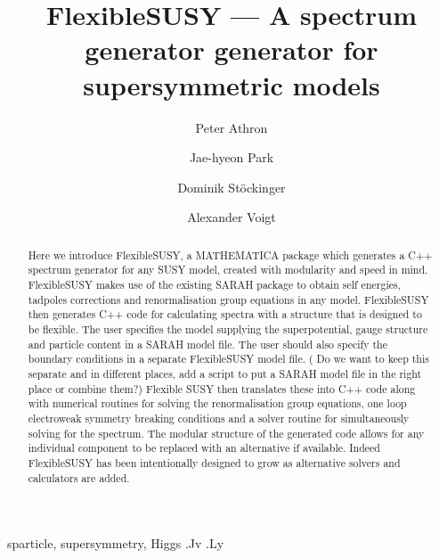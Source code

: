 \documentclass[final,3p,times,pdflatex]{elsarticle}
\newcommand{\sarah}{SARAH\xspace}
\newcommand{\fs}{FlexibleSUSY\xspace}
\begin{document}
\begin{frontmatter}

 \title{\Large\bf FlexibleSUSY --- A spectrum generator generator for supersymmetric models}

\author{Peter Athron}
\address{ARC Centre of Excellence for Particle Physics at 
the Tera-scale, School of Chemistry and Physics, University of Adelaide, 
Adelaide SA 5005 Australia}
\author{Jae-hyeon Park}
\author{Dominik St\"ockinger}
\author{Alexander Voigt}
\address{Institut f\"ur Kern- und Teilchenphysik,
TU Dresden, Zellescher Weg 19, 01069 Dresden, Germany}
   
  \begin{abstract}
   Here we introduce \fs, a MATHEMATICA package which generates a C++
   spectrum generator for any SUSY model, created with modularity and
   speed in mind.  \fs makes use of the existing \sarah package
   to obtain self energies, tadpoles corrections and renormalisation
   group equations in any model.  \fs then generates C++ code for
   calculating spectra with a structure that is designed to be
   flexible. The user specifies the model supplying the
   superpotential, gauge structure and particle content in a \sarah
   model file. The user should also specify the boundary conditions in
   a separate \fs model file. {\color{red}( Do we want to keep this
     separate and in different places, add a script to put a \sarah
     model file in the right place or combine them?)}  Flexible SUSY
   then translates these into C++ code along with numerical routines
   for solving the renormalisation group equations, one loop
   electroweak symmetry breaking conditions and a solver routine for
   simultaneously solving for the spectrum.  The modular structure of
   the generated code allows for any individual component to be
   replaced with an alternative if available.  Indeed \fs has been
   intentionally designed to grow as alternative solvers and
   calculators are added.
  \end{abstract}
\begin{keyword}
sparticle, 
supersymmetry, 
Higgs
.Jv
.Ly
\end{keyword}
\end{frontmatter}
\end{document}
